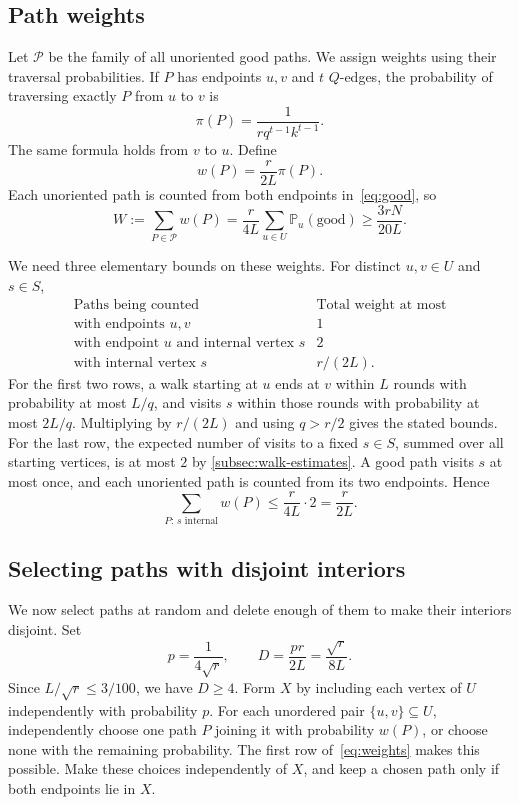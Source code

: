 \documentclass[11pt]{amsart}
\theoremstyle{remark}
\newcommand{\Prob}{\mathbb P}
\newcommand{\cP}{\mathcal P}
\begin{document}
\subsection{Path weights}

Let $\cP$ be the family of all unoriented good paths. We assign weights using their traversal probabilities. If $P$ has endpoints $u,v$ and $t$ $Q$-edges, the probability of traversing exactly $P$ from $u$ to $v$ is
\[
\pi(P)=\frac1{r q^{t-1}k^{t-1}}.
\]
The same formula holds from $v$ to $u$. Define
\[
w(P)=\frac r{2L}\pi(P).
\]
Each unoriented path is counted from both endpoints in~\eqref{eq:good}, so
\[
W:=\sum_{P\in\cP}w(P)
=\frac r{4L}\sum_{u\in U}\Prob_u(\text{good})
\ge\frac{3rN}{20L}.
\]

We need three elementary bounds on these weights. For distinct $u,v\in U$ and $s\in S$,
\begin{equation}\label{eq:weights}
\begin{array}{l|c}
\text{Paths being counted}&\text{Total weight at most}\\ \hline
\text{with endpoints }u,v&1\\
\text{with endpoint }u\text{ and internal vertex }s&2\\
\text{with internal vertex }s&r/(2L).
\end{array}
\end{equation}
For the first two rows, a walk starting at $u$ ends at $v$ within $L$ rounds with probability at most $L/q$, and visits $s$ within those rounds with probability at most $2L/q$. Multiplying by $r/(2L)$ and using $q>r/2$ gives the stated bounds.
For the last row, the expected number of visits to a fixed $s\in S$, summed over all starting vertices, is at most $2$ by \cref{subsec:walk-estimates}. A good path visits $s$ at most once, and each unoriented path is counted from its two endpoints. Hence
\[
\sum_{P:\,s\text{ internal}}w(P)
\le \frac r{4L}\cdot2=\frac r{2L}.
\]

\subsection{Selecting paths with disjoint interiors}

We now select paths at random and delete enough of them to make their interiors disjoint. Set
\[
p=\frac1{4\sqrt r},
\qquad
D=\frac{pr}{2L}=\frac{\sqrt r}{8L}.
\]
Since $L/\sqrt r\le3/100$, we have $D\ge4$. Form $X$ by including each vertex of $U$ independently with probability $p$.
For each unordered pair $\{u,v\}\subseteq U$, independently choose one path $P$ joining it with probability $w(P)$, or choose none with the remaining probability. The first row of~\eqref{eq:weights} makes this possible. Make these choices independently of $X$, and keep a chosen path only if both endpoints lie in $X$.
\end{document}

